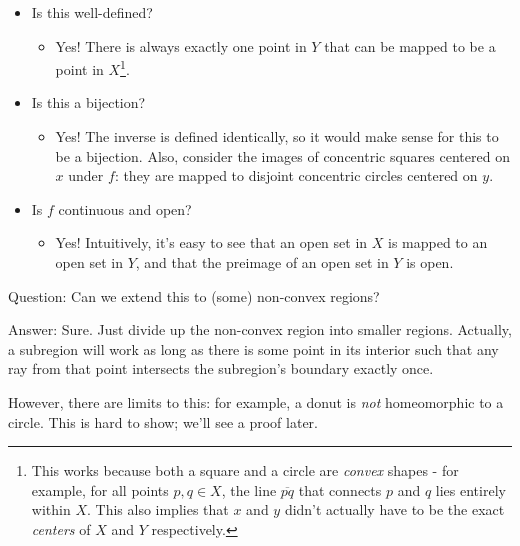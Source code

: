 \begin{itemize}
	\item Is this well-defined? 
	\begin{itemize}
		\item Yes! There is always exactly one point in $Y$ that can be mapped to be a point in $X$\footnote{This works because both a square and a circle are \emph{convex} shapes - for example, for all points $p,q\in X$, the line $\overline{pq}$ that connects $p$ and $q$ lies entirely within $X$. This also implies that $x$ and $y$ didn't actually have to be the exact \emph{centers} of $X$ and $Y$ respectively.}. 
	\end{itemize}
	\item Is this a bijection? 
	\begin{itemize}
		\item Yes! The inverse is defined identically, so it would make sense for this to be a bijection. Also, consider the images of concentric squares centered on $x$ under $f$: they are mapped to disjoint concentric circles centered on $y$. 
	\end{itemize}
	\item Is $f$ continuous and open? 
	\begin{itemize}
		\item Yes! Intuitively, it's easy to see that an open set in $X$ is mapped to an open set in $Y$, and that the preimage of an open set in $Y$ is open. 
	\end{itemize}
\end{itemize}

Question: Can we extend this to (some) non-convex regions? 

Answer: Sure. Just divide up the non-convex region into smaller regions. Actually, a subregion will work as long as there is some point in its interior such that any ray from that point intersects the subregion's boundary exactly once.

However, there are limits to this: for example, a donut is \emph{not} homeomorphic to a circle. This is hard to show; we'll see a proof later.

